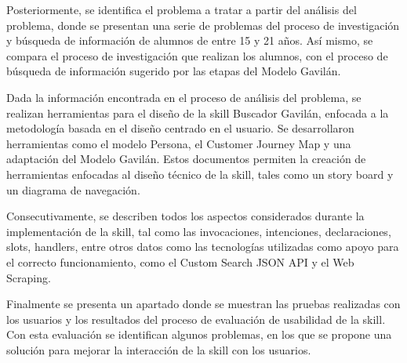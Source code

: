 Posteriormente, se identifica el problema a tratar a partir del análisis del problema, donde se presentan una serie de problemas del proceso de investigación y búsqueda de información de alumnos de entre 15 y 21 años. Así mismo, se compara el proceso de investigación que realizan los alumnos, con el proceso de búsqueda de información sugerido por las etapas del Modelo Gavilán.

Dada la información encontrada en el proceso de análisis del problema, se realizan herramientas para el diseño de la skill Buscador Gavilán, enfocada a la metodología basada en el diseño centrado en el usuario. Se desarrollaron herramientas como el modelo Persona, el Customer Journey Map y una adaptación del Modelo Gavilán. Estos documentos permiten la creación de herramientas enfocadas al diseño técnico de la skill, tales como un story board y un diagrama de navegación.

Consecutivamente, se describen todos los aspectos considerados durante la implementación de la skill, tal como las invocaciones, intenciones, declaraciones, slots, handlers, entre otros datos como las tecnologías utilizadas como apoyo para el correcto funcionamiento, como el Custom Search JSON API y el Web Scraping.

Finalmente se presenta un apartado donde se muestran las pruebas realizadas con los usuarios y los resultados del proceso de evaluación de usabilidad de la skill. Con esta evaluación se identifican algunos problemas, en los que se propone una solución para mejorar la interacción de la skill con los usuarios.
